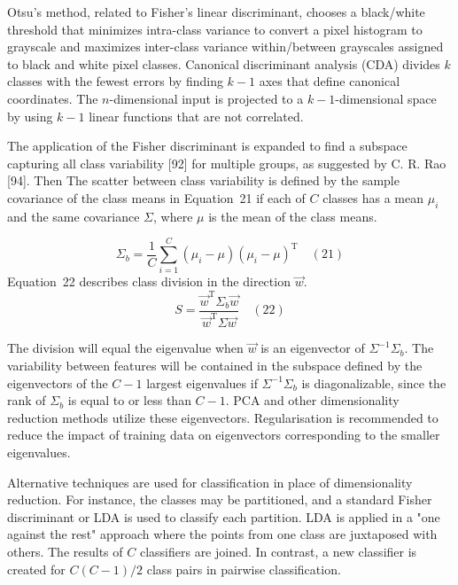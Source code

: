 \documentclass[preprint,12pt]{elsarticle}
\begin{document}
Otsu's method, related to Fisher's linear discriminant, chooses a black/white threshold that minimizes intra-class variance to convert a pixel histogram to grayscale and maximizes inter-class variance within/between grayscales assigned to black and white pixel classes. Canonical discriminant analysis (CDA) divides $k$ classes with the fewest errors by finding $k - 1$ axes that define canonical coordinates. The $n$-dimensional input is projected to a $k - 1$-dimensional space by using $k - 1$ linear functions that are not correlated.

The application of the Fisher discriminant is expanded to find a subspace capturing all class variability [92] for multiple groups, as suggested by C. R. Rao [94]. Then The scatter between class variability is defined by the sample covariance of the class means in Equation~21 if each of $C$ classes has a mean $\mu_{i}$ and the same covariance  $\Sigma$, where $\mu$ is the mean of the class means.

\begin{equation}
	\Sigma_{b}={\frac{1}{C}}\sum_{i=1}^{C}\left(\mu_{i}-\mu\right)\left(\mu_{i}-\mu\right)^{\mathrm{T}}
	\quad\left(21\right)
\end{equation}
Equation~22 describes class division in the direction $\vec{w}$.
\begin{equation}
	S={\frac{{\vec{w}}^{\mathrm{T}}\Sigma_{b}{\vec{w}}}{{\vec{w}}^{\mathrm{T}}\Sigma {\vec{w}}}}
	\quad\left(22\right)
\end{equation}

The division will equal the eigenvalue when $\vec{w}$ is an eigenvector of $\Sigma ^{-1}\Sigma_{b}$. The variability between features will be contained in the subspace defined by the eigenvectors of the $C - 1$ largest eigenvalues if $\Sigma ^{-1}\Sigma_{b}$ is diagonalizable, since the rank of $\Sigma_{b}$ is equal to or less than $C - 1$. PCA and other dimensionality reduction methods utilize these eigenvectors. Regularisation is recommended to reduce the impact of training data on eigenvectors corresponding to the smaller eigenvalues.

Alternative techniques are used for classification in place of dimensionality reduction. For instance, the classes may be partitioned, and a standard Fisher discriminant or LDA is used to classify each partition. LDA is applied in a "one against the rest" approach where the points from one class are juxtaposed with others. The results of $C$ classifiers are joined. In contrast, a new classifier is created for $ C(C - 1)/2$ class pairs in pairwise classification.
\end{document}
